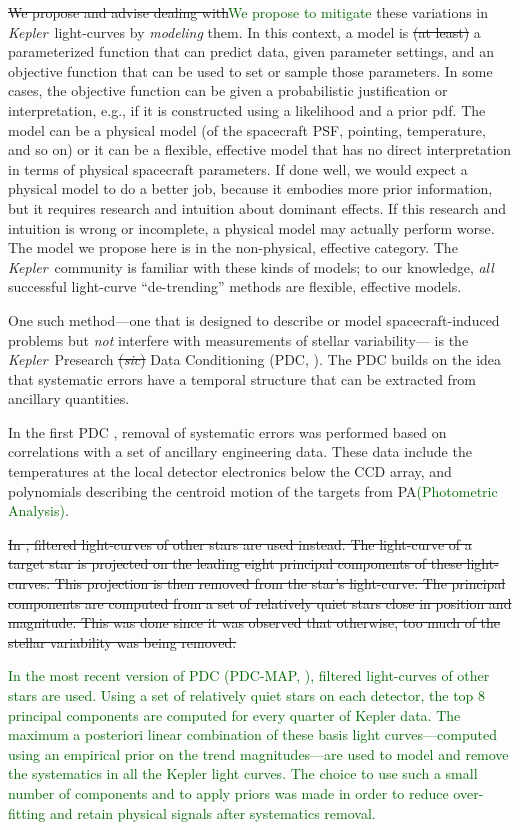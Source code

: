 \documentclass[12pt, preprint]{aastex}
\newcommand{\notenglish}[1]{\textit{#1}}
\newcommand{\sic}{\notenglish{sic}}
\newcommand{\project}[1]{\textsl{#1}}
\newcommand{\Kepler}{\project{Kepler}}
\newcommand{\revise}[1]{\textcolor{darkgreen}{#1}}
\newcommand{\remove}[1]{\sout{#1}}
\begin{document}
\remove{We propose and advise dealing with}\revise{We propose to mitigate} these variations in \Kepler\ light-curves by \emph{modeling} them.
In this context, a model is \remove{(at least)} a parameterized function that can predict data, given parameter settings,
  and an objective function that can be used to set or sample those parameters.
In some cases, the objective function can be given a probabilistic justification or interpretation, e.g., if it is constructed using a likelihood and a prior pdf.
The model can be a physical model (of the spacecraft PSF, pointing, temperature, and so on)
  or it can be a flexible, effective model that has no direct interpretation in terms of physical spacecraft parameters.
If done well, we would expect a physical model to do a better job,
  because it embodies more prior information,
  but it requires research and intuition about dominant effects. 
If this research and intuition is wrong or incomplete, a physical model may actually perform worse.
The model we propose here is in the non-physical, effective category.
The \Kepler\ community is familiar with these kinds of models;
  to our knowledge, \emph{all} successful light-curve ``de-trending'' methods
  are flexible, effective models.

One such method---one that is designed to describe or model spacecraft-induced problems
  but \emph{not} interfere with measurements of stellar variability---%
  is the \Kepler\ Presearch \remove{(\sic)} Data Conditioning (PDC, \citealt{pdc1}).
The PDC builds on the idea that systematic errors have a temporal structure that can be extracted from ancillary quantities. 

In the first PDC \citep{pdc1}, 
  removal of systematic errors was performed based on correlations with a set of ancillary engineering data. 
These data include the temperatures at the local detector electronics below the CCD array, 
  and polynomials describing the centroid motion of the targets from PA\revise{(Photometric Analysis)}.

\remove{In \cite{pdc2,pdc3}, filtered light-curves of other stars are used instead. 
The light-curve of a target star is projected on the leading eight principal components of these light-curves. 
This projection is then removed from the star's light-curve. 
The principal components are computed from a set of relatively quiet stars close in position and magnitude. 
This was done since it was observed that otherwise, too much of the stellar variability was being removed.}

\revise{In the most recent version of PDC (PDC-MAP, \citealt{pdc2,pdc3}), filtered light-curves of other stars are used. Using a set of relatively quiet stars on each detector, the
top 8 principal components are computed for every quarter of Kepler
data. The maximum a posteriori linear combination of these basis light
curves---computed using an empirical prior on the trend
magnitudes---are used to model and remove the systematics in all the
Kepler light curves. The choice to use such a small number of
components and to apply priors was made in order to reduce
over-fitting and retain physical signals after systematics removal.}
\end{document}
